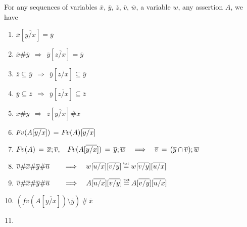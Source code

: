 \begin{lemma}
\label{l:sfs}
For any sequences of variables $\overline x$, $\overline y$, $\overline z$, $\overline v$, $\overline w$, a variable $w$, any assertion $A$, we have
\begin{enumerate}
\item
\label{l:sfs:zero}
$ \overline x[\overline{y/x} ] = \overline y $
\item
\label{l:sfs:zero:one}
$ \overline {x} \# \overline y \ \   \Rightarrow \ \  \overline y[\overline{z / x} ] = \overline y $
\item
\label{l:sfs:one}
$\overline {z} \subseteq \overline y \ \   \Rightarrow \ \  \overline y[\overline{z / x} ] \subseteq \overline y $
\item
\label{l:sfs:two}
$\overline {y} \subseteq \overline z \ \   \Rightarrow \ \  \overline y[\overline{z / x} ] \subseteq \overline z $
\item
\label{l:sfs:three}
 $\overline x \# \overline y \ \ \Rightarrow \ \ {\overline z}[\overline{y / x}]  \# \overline x $ 
 \item
 \label{l:sfs:four}
 ${\hspace{-1pt}F\hspace{-1pt}}v(A[\overline{y / x}] )\, =\, {\hspace{-1pt}F\hspace{-1pt}}v(A)[\overline{y / x}] $
 \item
 \label{l:sfs:five}
 $\fv(A)\, =\, \overline x; \overline v, \ \ \   \fv(A[\overline{y / x}] )\, = \,   \overline y; \overline w 
 \ \ \ \Longrightarrow\ \ \ 
 \overline v \, = \, (\overline {y}\cap\overline{v}); \overline w $
  \item
  \label{l:sfs:sixa}
 $ \overline v \# \overline x   \# \overline y   \# \overline u  \ \ \    \ \ \ \Longrightarrow\ \ \ 
w[ \overline {u/x} ][ \overline {v/y} ]  \txteq w[ \overline {v/y} ][ \overline {u/x} ]  $

 \item
  \label{l:sfs:six}
 $ \overline v \# \overline x   \# \overline y   \# \overline u  \ \ \    \ \ \ \Longrightarrow\ \ \ 
A[ \overline {u/x} ][ \overline {v/y} ]  \txteq A[ \overline {v/y} ][ \overline {u/x} ]  $
\item
  \label{l:sfs:seven}
 $( fv (A[ \overline {y/x} ])\setminus \overline y)\, \# \, \overline x$
  \item
  \end{enumerate}

\end{lemma}

